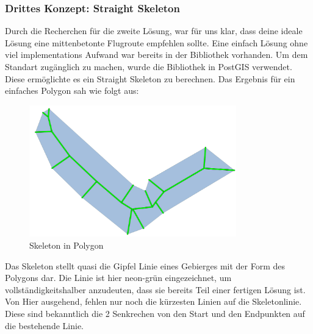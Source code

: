\subsubsection{Drittes Konzept: Straight Skeleton}
Durch die Recherchen für die zweite Lösung, war für uns klar, dass deine ideale Lösung eine mittenbetonte Flugroute empfehlen sollte. Eine einfach Lösung ohne viel implementations Aufwand war bereits in der  Bibliothek vorhanden. Um  dem  Standart zugänglich zu machen, wurde die  Bibliothek in PostGIS verwendet. Diese ermöglichte es ein Straight Skeleton zu berechnen. Das Ergebnis für ein einfaches Polygon sah wie folgt aus:
\begin{figure}[h]
	\centering
	\includegraphics[width=0.8\textwidth]{images/routing/skeleton.png}
	\caption{Skeleton in Polygon}
	\label{fig:skeleton-in-polygon}
\end{figure}
Das Skeleton stellt quasi die Gipfel Linie eines Gebierges mit der Form des Polygons dar. Die Linie ist hier neon-grün eingezeichnet, um vollständigkeitshalber anzudeuten, dass sie bereits Teil einer fertigen Lösung ist. Von Hier ausgehend, fehlen nur noch die kürzesten Linien auf die Skeletonlinie. Diese sind bekanntlich die 2 Senkrechen von den Start und den Endpunkten auf die bestehende Linie.

